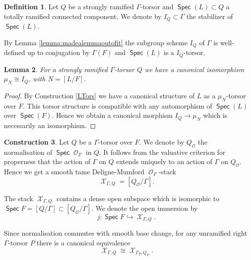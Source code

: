 \documentclass{article}
\DeclareMathOperator{\Xc}{\mathcal{X}}
\DeclareMathOperator{\Gal}{Gal}
\DeclareMathOperator{\Spec}{\mathsf{Spec}}
\DeclareMathOperator{\Oo}{\mathcal{O}}
\theoremstyle{definition}
\newtheorem{definition}{Definition}[section]
\newtheorem{construction}[definition]{Construction}
\theoremstyle{plain}
\newtheorem{lemma}[definition]{Lemma}
\begin{document}
\begin{definition}
  Let $Q$ be a strongly ramified $\Gamma$-torsor and $\Spec(L) \subset Q$ a totally ramified connected component. We denote by $I_Q \subset \Gamma$ the stabilizer of $\Spec(L)$. 
\end{definition}
By Lemma \ref{lemma:madealemmaoutofit} the subgroup scheme $I_Q$ of $\Gamma$ is well-defined up to conjugation by $\Gamma(F)$ and $\Spec(L)$ is a $I_Q$-torsor. 


\begin{lemma}\label{canincc} For a strongly ramified $\Gamma$-torsor $Q$ we have a canonical isomorphism $\mu_N \cong I_Q$, with $N= [L/F]$.
\end{lemma}
\begin{proof} 
By Construction \ref{LTors} we have a canonical structure of $L$ as a $\mu_N$-torsor over $F$. This torsor structure is compatible with any automorphism of $\Spec(L)$ over $\Spec(F)$. Hence we obtain a canonical  morphism $I_Q \to \mu_N$ which is necessarily an isomorphism.
\end{proof}

\begin{construction}\label{defi:XGamma}
 Let $Q$ be a $\Gamma$-torsor over $F$. We denote by $Q_{\Oo}$ the normalisation of $\Spec \Oo_F$ in $Q$. It follows from the valuative criterion for properness that the action of $\Gamma$ on $Q$ extends uniquely to an action of $\Gamma$ on $Q_{\Oo}$. Hence we get a smooth tame Deligne-Mumford $\Oo_F$-stack
$$\Xc_{\Gamma,Q} = [Q_{\Oo}/\Gamma].$$
\end{construction}

The stack $\Xc_{\Gamma,Q}$ contains a dense open subspace which is isomorphic to $\Spec F = [Q/\Gamma] \subset [Q_{\Oo}/\Gamma]$. We denote the open immersion by
$$j\colon \Spec F \hookrightarrow \Xc_{\Gamma,Q}.$$


Since normalisation commutes with smooth base change, for any unramified right $\Gamma$-torsor $P$ there is a canonical equivalence
\[   \Xc_{\Gamma,Q} \cong \Xc_{\Gamma_P,Q_P}.     \]
\end{document}
